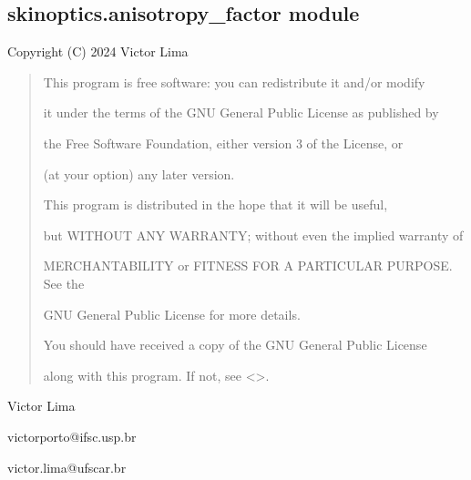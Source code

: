\documentclass[letterpaper,10pt,english]{sphinxmanual}
\begin{document}
\subsection{skinoptics.anisotropy\_factor module}
\label{\detokenize{06_anisotropy_factor:module-skinoptics.anisotropy_factor}}\label{\detokenize{06_anisotropy_factor:skinoptics-anisotropy-factor-module}}\label{\detokenize{06_anisotropy_factor::doc}}
\sphinxAtStartPar
Copyright (C) 2024 Victor Lima
\begin{quote}

\begin{DUlineblock}{0em}
\item[] This program is free software: you can redistribute it and/or modify
\item[] it under the terms of the GNU General Public License as published by
\item[] the Free Software Foundation, either version 3 of the License, or
\item[] (at your option) any later version.
\end{DUlineblock}

\begin{DUlineblock}{0em}
\item[] This program is distributed in the hope that it will be useful,
\item[] but WITHOUT ANY WARRANTY; without even the implied warranty of
\item[] MERCHANTABILITY or FITNESS FOR A PARTICULAR PURPOSE.  See the
\item[] GNU General Public License for more details.
\end{DUlineblock}

\begin{DUlineblock}{0em}
\item[] You should have received a copy of the GNU General Public License
\item[] along with this program.  If not, see \textless{}\textgreater{}.
\end{DUlineblock}
\end{quote}

\begin{DUlineblock}{0em}
\item[] Victor Lima
\item[] victorporto@ifsc.usp.br
\item[] victor.lima@ufscar.br
\end{DUlineblock}
\end{document}
